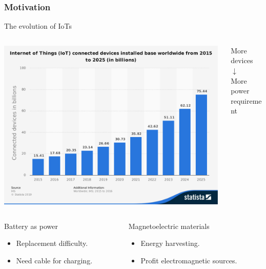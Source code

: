 \documentclass[compress]{beamer}
\begin{document}
\begin{frame}\frametitle{Motivation}
\vspace{-12.5pt}
The evolution of IoTs \\
\begin{columns}[totalwidth=\textwidth] 
   \begin{column}{.75\textwidth} 
   \includegraphics[width=0.99\textwidth]{Graphic/01_iotnumber.pdf}
   \end{column}
   \begin{column}{.24\textwidth}
   \centering
   More devices \\ [0.2cm]
   {\color{red} \Huge$\mathbf{\downarrow}$} \\ [0.2cm]
    More power requirement \\ [0.2cm]
   \end{column}
\end{columns}
\begin{columns}[totalwidth=\textwidth] 
   \begin{column}{.45\textwidth} 
   \begin{alertblock}{Battery as power}
	\begin{itemize}[label=$\boxed{\color{red} \times}$, font=\small, leftmargin=*]
	\item Replacement difficulty.
	\item Need cable for charging.
	\end{itemize}
	\end{alertblock}
   \end{column}
   \begin{column}{.49\textwidth}
       \begin{exampleblock}{Magnetoelectric materials}
	\begin{itemize}[label=$\boxed{\color{green} \checkmark}$, font=\small, leftmargin=*]
	\item Energy harvesting.
	\item Profit electromagnetic sources.
	\end{itemize}
	\end{exampleblock}
   \end{column}
\end{columns}
\end{frame}
\end{document}
